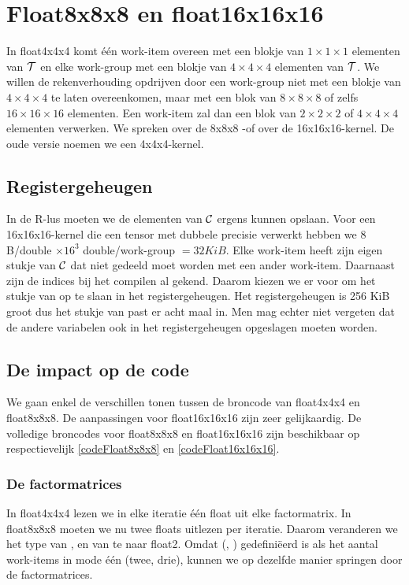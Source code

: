 \section{Float8x8x8 en float16x16x16}
In float4x4x4 komt \'e\'en work-item overeen met een blokje van $1 \times 1 \times 1$ elementen van $\mathcal{T}$ en elke work-group met een blokje van $4 \times 4 \times 4$ elementen van $\mathcal{T}$. We willen de rekenverhouding opdrijven door een work-group niet met een blokje van $4 \times 4 \times 4$ te laten overeenkomen, maar met een blok van $8 \times 8 \times 8$ of zelfs $16 \times 16 \times 16$ elementen. Een work-item zal dan een blok van $2 \times 2 \times 2$ of $4 \times 4 \times 4$ elementen verwerken. We spreken over de 8x8x8 -of over de 16x16x16-kernel. De oude versie noemen we een 4x4x4-kernel.



\subsection{Registergeheugen}
In de R-lus moeten we de elementen van $\mathcal{C}$ ergens kunnen opslaan. Voor een 16x16x16-kernel die een tensor met dubbele precisie verwerkt hebben we $8$ B/double $\times 16^3$ double/work-group $= 32KiB$. Elke work-item heeft zijn eigen stukje van $\mathcal{C}$ dat niet gedeeld moet worden met een ander work-item. Daarnaast zijn de indices bij het compilen al gekend. Daarom kiezen we er voor om het stukje van \CC{} op te slaan in het registergeheugen. Het registergeheugen is 256 KiB groot dus het stukje van \CC{} past er acht maal in.  Men mag echter niet vergeten dat de andere variabelen ook in het registergeheugen opgeslagen moeten worden. %

\subsection{De impact op de code}
We gaan enkel de verschillen tonen tussen de broncode van float4x4x4 en float8x8x8. De aanpassingen voor float16x16x16 zijn zeer gelijkaardig. De volledige broncodes voor float8x8x8 en float16x16x16 zijn beschikbaar op respectievelijk \ref{codeFloat8x8x8} en \ref{codeFloat16x16x16}.
 
\subsubsection{De factormatrices}
In float4x4x4 lezen we in elke iteratie \'e\'en float uit elke factormatrix. In float8x8x8 moeten we nu twee floats uitlezen per iteratie. Daarom veranderen we het type van ,  en van  te naar float2. Omdat  (, ) gedefini\"eerd is als het aantal work-items in mode \'e\'en (twee, drie), kunnen we op dezelfde manier springen door de factormatrices.

